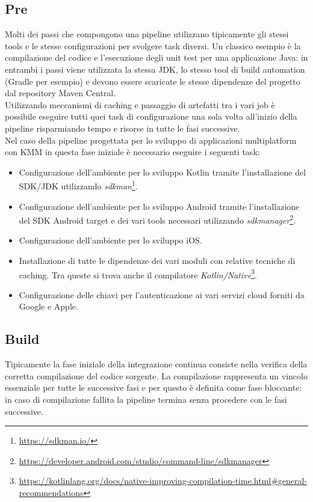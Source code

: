 \subsection{Pre}
Molti dei passi che compongono una pipeline utilizzano tipicamente gli stessi tools e le stesse configurazioni per svolgere task diversi. Un classico esempio è la compilazione del codice e l'esecuzione degli unit test per una applicazione Java: in entrambi i passi viene utilizzata la stessa JDK, lo stesso tool di build automation (Gradle per esempio) e devono essere scaricate le stesse dipendenze del progetto dal repository Maven Central.\\
Utilizzando meccanismi di caching e passaggio di artefatti tra i vari job è possibile eseguire tutti quei task di configurazione una sola volta all'inizio della pipeline risparmiando tempo e risorse in tutte le fasi successive.\\
Nel caso della pipeline progettata per lo sviluppo di applicazioni multiplatform con KMM in questa fase iniziale è necessario eseguire i seguenti task:
\begin{itemize}
    \item Configurazione dell'ambiente per lo sviluppo Kotlin tramite l'installazione del SDK/JDK utilizzando \textit{sdkman}\footnote{\url{https://sdkman.io/}}.
    \item Configurazione dell'ambiente per lo sviluppo Android tramite l'installazione del SDK Android target e dei vari tools necessari utilizzando \textit{sdkmanager}\footnote{\url{https://developer.android.com/studio/command-line/sdkmanager}}.
    \item Configurazione dell'ambiente per lo sviluppo iOS.
    \item Installazione di tutte le dipendenze dei vari moduli con relative tecniche di caching. Tra queste si trova anche il compilatore \textit{Kotlin/Native}\footnote{\url{https://kotlinlang.org/docs/native-improving-compilation-time.html\#general-recommendations}}.
    \item Configurazione delle chiavi per l'autenticazione ai vari servizi cloud forniti da Google e Apple.
\end{itemize}

\subsection{Build}
Tipicamente la fase iniziale della integrazione continua consiste nella verifica della corretta compilazione del codice sorgente. La compilazione rappresenta un vincolo essenziale per tutte le successive fasi e per questo è definita come fase bloccante: in caso di compilazione fallita la pipeline termina senza procedere con le fasi successive.

